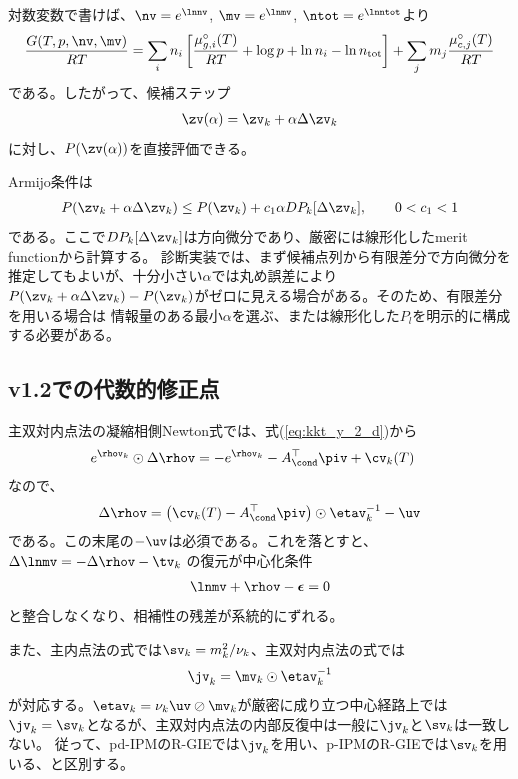 対数変数で書けば、$\nv=e^{\lnnv}$, $\mv=e^{\lnmv}$, $\ntot=e^{\lnntot}$より
\begin{align}
    \frac{G(T,p,\nv,\mv)}{RT}
    =
    \sum_i n_i
    \left[
        \frac{\mu^\circ_{g,i}(T)}{RT}
        + \log p
        + \ln n_i
        - \ln n_{\rm tot}
    \right]
    +
    \sum_j m_j \frac{\mu^\circ_{c,j}(T)}{RT}
\end{align}
である。したがって、候補ステップ
\begin{align}
    \zv(\alpha) = \zv_k + \alpha \Delta \zv_k
\end{align}
に対し、$P(\zv(\alpha))$を直接評価できる。

Armijo条件は
\begin{align}
    P(\zv_k + \alpha \Delta \zv_k)
    \le
    P(\zv_k) + c_1 \alpha D P_k[\Delta \zv_k],
    \qquad 0<c_1<1
\end{align}
である。ここで$D P_k[\Delta \zv_k]$は方向微分であり、厳密には線形化したmerit functionから計算する。
診断実装では、まず候補点列から有限差分で方向微分を推定してもよいが、十分小さい$\alpha$では丸め誤差により
$P(\zv_k+\alpha\Delta\zv_k)-P(\zv_k)$がゼロに見える場合がある。そのため、有限差分を用いる場合は
情報量のある最小$\alpha$を選ぶ、または線形化した$P_l$を明示的に構成する必要がある。

\subsection*{v1.2での代数的修正点}

主双対内点法の凝縮相側Newton式では、式(\ref{eq:kkt_y_2_d})から
\begin{align}
      e^{\rhov_k} \odot \Delta \rhov
      &= - e^{\rhov_k} - A_\cond^\top \piv + \cv_k(T)
\end{align}
なので、
\begin{align}
      \Delta \rhov
      =
      \left(\cv_k(T)-A_\cond^\top \piv\right)\odot\etav_k^{-1}
      - \uv
\end{align}
である。この末尾の$-\uv$は必須である。これを落とすと、$\Delta \lnmv=-\Delta\rhov-\tv_k$
の復元が中心化条件
\begin{align}
    \lnmv+\rhov-\boldsymbol{\epsilon}=0
\end{align}
と整合しなくなり、相補性の残差が系統的にずれる。

また、主内点法の式では$\sv_k=m_k^2/\nu_k$、主双対内点法の式では
\begin{align}
    \jv_k=\mv_k\odot\etav_k^{-1}
\end{align}
が対応する。$\etav_k=\nu_k\uv\oslash\mv_k$が厳密に成り立つ中心経路上では
$\jv_k=\sv_k$となるが、主双対内点法の内部反復中は一般に$\jv_k$と$\sv_k$は一致しない。
従って、pd-IPMのR-GIEでは$\jv_k$を用い、p-IPMのR-GIEでは$\sv_k$を用いる、と区別する。

